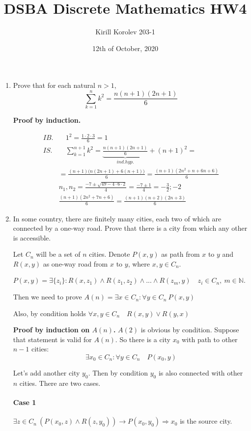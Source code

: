 \documentclass{article}
\title{DSBA Discrete Mathematics HW4}
\author{Kirill Korolev 203-1}
\date{12th of October, 2020}
\begin{document}
\maketitle

\begin{enumerate}
\item Prove that for each natural $n > 1$,
\[\sum_{k=1}^{n} k^2 = \frac{n(n+1)(2n+1)}{6}\]

\textbf{Proof by induction.}

\begin{align*}
IB.& \quad 1^2 = \frac{1 \cdot 2 \cdot 3}{6} = 1\\
IS.& \quad \sum_{k=1}^{n + 1} k^2 = \underbrace{\frac{n(n+1)(2n+1)}{6}}_{ind. hyp.} + (n+1)^2=\\
&=\frac{(n+1)\bigg(n(2n+1) + 6(n+1)\bigg)}{6} = \frac{(n+1)(2n^2 + n + 6n + 6)}{6}\\
&n_1, n_2 = \frac{-7 \pm \sqrt{49 - 4 \cdot 6 \cdot 2}}{4} = \frac{-7 \pm 1}{4} = -\frac{3}{2}; -2\\
&\frac{(n+1)(2n^2 + 7n + 6)}{6} = \frac{(n+1)(n+2)(2n+3)}{6}
\end{align*}

\item In some country, there are finitely many cities, each two of which are connected by a one-way road. Prove that there is a city from which any other is accessible.

Let $C_n$ will be a set of $n$ cities. Denote $P(x, y)$ as path from $x$ to $y$ and $R(x, y)$ as one-way road from $x$ to $y$, where $x, y \in C_n$. 

$P(x, y) = \exists \{z_i\} : R(x, z_1) \land R(z_1, z_2) \land ... \land R(z_m, y) \quad z_i \in C_n, \: m \in \mathbb{N}$.

Then we need to prove $A(n) = \exists x \in C_n : \forall y \in C_n \: P(x, y)$

Also, by condition holds $\forall x, y \in C_n \quad R(x, y) \lor R(y, x)$


\textbf{Proof by induction on $A(n)$.}
$A(2)$ is obvious by condition. Suppose that statement is valid for $A(n)$. So there is a city $x_0$ with path to other $n - 1$ cities:
\[\exists x_0 \in C_n : \forall y \in C_n \quad P(x_0, y) \]

Let's add another city $y_0$. Then by condition $y_0$ is also connected with other $n$ cities. There are two cases.

\paragraph{Case 1}
$\exists z \in C_n \: (P(x_0, z) \land R(z, y_0)) \to P(x_0, y_0) \Rightarrow x_0 $ is the source city. 

\end{enumerate}
\end{document}
